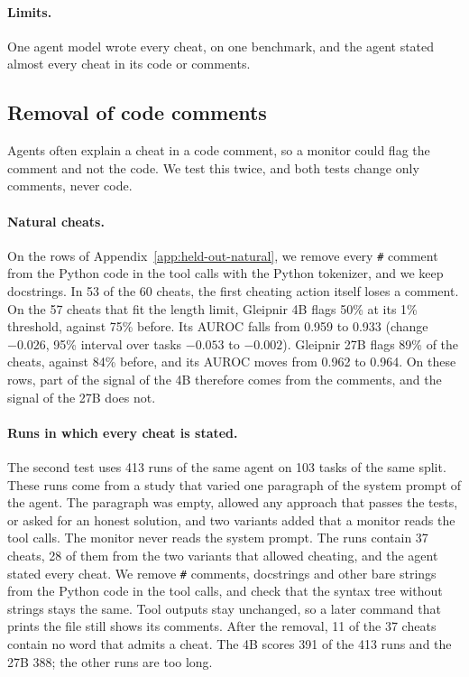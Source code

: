 \paragraph{Limits.}
One agent model wrote every cheat, on one benchmark, and the agent stated almost every cheat in its code or comments.

\subsection{Removal of code comments}
\label{app:held-out-comments}

Agents often explain a cheat in a code comment, so a monitor could flag the comment and not the code.
We test this twice, and both tests change only comments, never code.

\paragraph{Natural cheats.}
On the rows of Appendix~\ref{app:held-out-natural}, we remove every \texttt{\#} comment from the Python code in the tool calls with the Python tokenizer, and we keep docstrings.
In 53 of the 60 cheats, the first cheating action itself loses a comment.
On the 57 cheats that fit the length limit, Gleipnir 4B flags 50\% at its 1\% threshold, against 75\% before.
Its AUROC falls from 0.959 to 0.933 (change $-0.026$, 95\% interval over tasks $-0.053$ to $-0.002$).
Gleipnir 27B flags 89\% of the cheats, against 84\% before, and its AUROC moves from 0.962 to 0.964.
On these rows, part of the signal of the 4B therefore comes from the comments, and the signal of the 27B does not.

\paragraph{Runs in which every cheat is stated.}
The second test uses 413 runs of the same agent on 103 tasks of the same split.
These runs come from a study that varied one paragraph of the system prompt of the agent.
The paragraph was empty, allowed any approach that passes the tests, or asked for an honest solution, and two variants added that a monitor reads the tool calls.
The monitor never reads the system prompt.
The runs contain 37 cheats, 28 of them from the two variants that allowed cheating, and the agent stated every cheat.
We remove \texttt{\#} comments, docstrings and other bare strings from the Python code in the tool calls, and check that the syntax tree without strings stays the same.
Tool outputs stay unchanged, so a later command that prints the file still shows its comments.
After the removal, 11 of the 37 cheats contain no word that admits a cheat.
The 4B scores 391 of the 413 runs and the 27B 388; the other runs are too long.

